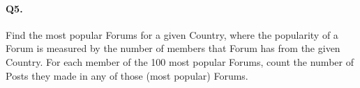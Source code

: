 \paragraph{Q5.}
Find the most popular Forums for a given Country, where the popularity
of a Forum is measured by the number of members that Forum has from the
given Country.
For each member of the 100 most popular Forums, count the number of
Posts they made in any of those (most popular) Forums.
